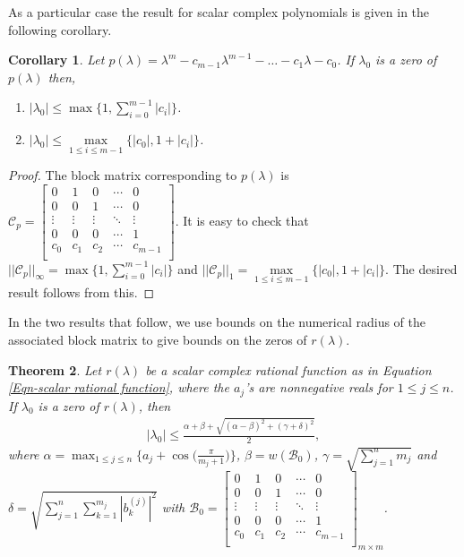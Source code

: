 \documentclass[12pt, reqno]{amsart}
\newtheorem{theorem}{Theorem}[section]
\newtheorem{corollary}[theorem]{Corollary}
\theoremstyle{definition}
\theoremstyle{remark}
\numberwithin{equation}{section}
\begin{document}
\medskip
\noindent
As a particular case the result for scalar 
complex polynomials is given in the following corollary.
\begin{corollary}\label{Cor-bounds for zeros using norms}
Let $p(\lambda) = \lambda^m -c_{m-1}\lambda^{m-1} - \dots -c_1 \lambda -c_0$. If 
$\lambda_0$ is a zero of $p(\lambda)$ then,
\begin{enumerate}
\item $|\lambda_0| \leq \max \Big\{1, \displaystyle \sum_{i=0}^{m-1}|c_i| \Big\}$.
\item $|\lambda_0| \leq \max\limits_{1 \leq i \leq m-1} \{|c_0|, 1+|c_i| \}$.
\end{enumerate} 
\end{corollary}
\begin{proof}
The block matrix corresponding to $p(\lambda)$ is $\mathcal{C}_p = \begin{bmatrix}
0 & 1 & 0 & \cdots & 0\\
0 & 0 & 1 & \cdots & 0\\
\vdots & \vdots & \vdots & \ddots & \vdots\\
0 & 0 & 0 & \cdots & 1\\
c_0 & c_1 & c_2 & \cdots & c_{m-1}\\
\end{bmatrix}$. It is easy to check that $||\mathcal{C}_p||_\infty = \max 
\Big\{1, \displaystyle \sum_{i=0}^{m-1}|c_i| \Big\}$ and $||\mathcal{C}_p||_1 = 
\max\limits_{1 \leq i \leq m-1} \{|c_0|, 1+|c_i| \}$. The desired result follows 
from this. 
\end{proof}

In the two results that follow, we use bounds on the numerical radius of the
associated block matrix to give bounds on the zeros of $r(\lambda)$.

\begin{theorem}\label{Thm-bounds on zeros using numerical range-2}
Let $r(\lambda)$ be a scalar complex rational function as in Equation 
\eqref{Eqn-scalar rational function}, where the $a_j$'s are nonnegative reals 
for $1 \leq j \leq n$. If $\lambda_0$ is a zero of $r(\lambda)$, then 
\begin{align*}
|\lambda_0| \leq \displaystyle \frac{\alpha+ \beta +\sqrt{(\alpha-\beta)^2 + 
(\gamma+\delta)^2}}{2},
\end{align*}
where $\alpha = \displaystyle \max_{1 \leq j \leq n} \Big\{a_j + 
\cos\Big(\frac{\pi}{m_j+1}\Big) \Big\}$, $\beta = w(\mathcal{B}_0)$, $\gamma = 
\displaystyle \sqrt{\sum_{j=1}^{n} m_j}$ and $\delta = \displaystyle 
\sqrt{ \sum_{j=1}^{n}\sum_{k=1}^{m_j} {|b_{k}^{(j)}|}^2}$ with $\mathcal{B}_0 = 
\begin{bmatrix}
0 & 1 & 0 & \cdots & 0\\
0 & 0 & 1 & \cdots & 0\\
\vdots & \vdots & \vdots & \ddots & \vdots\\
0 & 0 & 0 & \cdots & 1\\
c_0 & c_1 & c_2 & \cdots & c_{m-1}\\ 
\end{bmatrix}_{m \times m}$.
\end{theorem}
\end{document}
